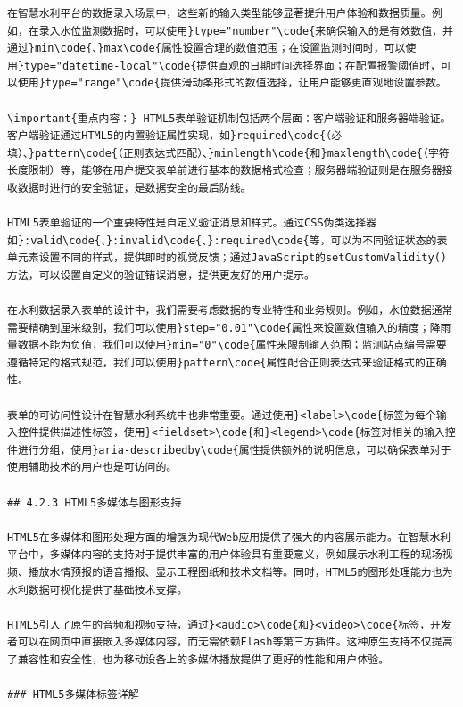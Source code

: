 \begin{lstlisting}
在智慧水利平台的数据录入场景中，这些新的输入类型能够显著提升用户体验和数据质量。例如，在录入水位监测数据时，可以使用}type="number"\code{来确保输入的是有效数值，并通过}min\code{、}max\code{属性设置合理的数值范围；在设置监测时间时，可以使用}type="datetime-local"\code{提供直观的日期时间选择界面；在配置报警阈值时，可以使用}type="range"\code{提供滑动条形式的数值选择，让用户能够更直观地设置参数。

\important{重点内容：} HTML5表单验证机制包括两个层面：客户端验证和服务器端验证。客户端验证通过HTML5的内置验证属性实现，如}required\code{（必填）、}pattern\code{（正则表达式匹配）、}minlength\code{和}maxlength\code{（字符长度限制）等，能够在用户提交表单前进行基本的数据格式检查；服务器端验证则是在服务器接收数据时进行的安全验证，是数据安全的最后防线。

HTML5表单验证的一个重要特性是自定义验证消息和样式。通过CSS伪类选择器如}:valid\code{、}:invalid\code{、}:required\code{等，可以为不同验证状态的表单元素设置不同的样式，提供即时的视觉反馈；通过JavaScript的setCustomValidity()方法，可以设置自定义的验证错误消息，提供更友好的用户提示。

在水利数据录入表单的设计中，我们需要考虑数据的专业特性和业务规则。例如，水位数据通常需要精确到厘米级别，我们可以使用}step="0.01"\code{属性来设置数值输入的精度；降雨量数据不能为负值，我们可以使用}min="0"\code{属性来限制输入范围；监测站点编号需要遵循特定的格式规范，我们可以使用}pattern\code{属性配合正则表达式来验证格式的正确性。

表单的可访问性设计在智慧水利系统中也非常重要。通过使用}<label>\code{标签为每个输入控件提供描述性标签，使用}<fieldset>\code{和}<legend>\code{标签对相关的输入控件进行分组，使用}aria-describedby\code{属性提供额外的说明信息，可以确保表单对于使用辅助技术的用户也是可访问的。

## 4.2.3 HTML5多媒体与图形支持

HTML5在多媒体和图形处理方面的增强为现代Web应用提供了强大的内容展示能力。在智慧水利平台中，多媒体内容的支持对于提供丰富的用户体验具有重要意义，例如展示水利工程的现场视频、播放水情预报的语音播报、显示工程图纸和技术文档等。同时，HTML5的图形处理能力也为水利数据可视化提供了基础技术支撑。

HTML5引入了原生的音频和视频支持，通过}<audio>\code{和}<video>\code{标签，开发者可以在网页中直接嵌入多媒体内容，而无需依赖Flash等第三方插件。这种原生支持不仅提高了兼容性和安全性，也为移动设备上的多媒体播放提供了更好的性能和用户体验。

### HTML5多媒体标签详解


\end{lstlisting}
